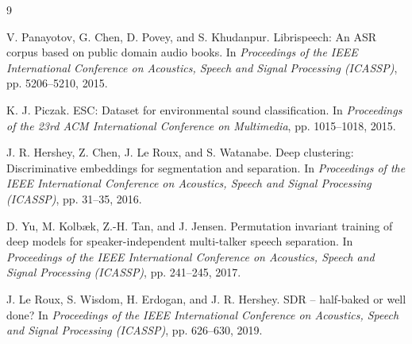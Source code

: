\documentclass[a4paper, 12pt]{ctexart}
\begin{document}
\begin{thebibliography}{9}

V. Panayotov, G. Chen, D. Povey, and S. Khudanpur.
\newblock Librispeech: An ASR corpus based on public domain audio books.
\newblock In \emph{Proceedings of the IEEE International Conference on Acoustics, Speech and Signal Processing (ICASSP)}, pp. 5206--5210, 2015.

K. J. Piczak.
\newblock ESC: Dataset for environmental sound classification.
\newblock In \emph{Proceedings of the 23rd ACM International Conference on Multimedia}, pp. 1015--1018, 2015.

J. R. Hershey, Z. Chen, J. Le Roux, and S. Watanabe.
\newblock Deep clustering: Discriminative embeddings for segmentation and separation.
\newblock In \emph{Proceedings of the IEEE International Conference on Acoustics, Speech and Signal Processing (ICASSP)}, pp. 31--35, 2016.

D. Yu, M. Kolb{\ae}k, Z.-H. Tan, and J. Jensen.
\newblock Permutation invariant training of deep models for speaker-independent multi-talker speech separation.
\newblock In \emph{Proceedings of the IEEE International Conference on Acoustics, Speech and Signal Processing (ICASSP)}, pp. 241--245, 2017.

J. Le Roux, S. Wisdom, H. Erdogan, and J. R. Hershey.
\newblock SDR -- half-baked or well done?
\newblock In \emph{Proceedings of the IEEE International Conference on Acoustics, Speech and Signal Processing (ICASSP)}, pp. 626--630, 2019.

\end{thebibliography}
\end{document}
